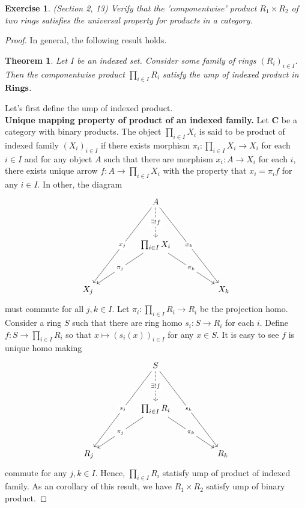 \documentclass[a4paper, 11pt]{book}
\theoremstyle{plain}
\newtheorem{exercise}{Exercise}
\newtheorem*{theorem}{Theorem}
\theoremstyle{plain}
\newcommand{\mb}{\mathbf}
\newcommand{\arr}{\rightarrow}
\newcommand{\C}{\mathbf{C}}
\begin{document}
  \begin{exercise}
    (Section 2, 13) 
    Verify that the 'componentwise' product $R_1 \times R_2$ of two rings satisfies the universal property for products in a category.
  \end{exercise}
  \begin{proof}
    In general, the following result holds.
    \begin{theorem}
      Let $I$ be an indexed set. Consider some family of rings $(R_i)_{i \in I}$. Then the componentwise product $\prod_{i \in I} R_i$ satisfy the ump of indexed product in $\mb{Rings}$. 
    \end{theorem}
      Let's first define the ump of indexed product. \\
      \textbf{Unique mapping property of product of an indexed family.} Let $\C$ be a category with binary products. The object $\prod_{i \in I} X_i$ is said to be product of indexed family $(X_i)_{i \in I}$ if there exists morphism $\pi_i:\prod_{i \in I} X_i \arr X_i$ for each $i \in I$ and for any object $A$ such that there are morphism $x_i: A \arr X_i$ for each $i$, there exists unique arrow $f:A \arr \prod_{i \in I} X_i$ with the property that $x_i=\pi_i f$ for any $i \in I$. In other, the diagram 
      \[\begin{tikzcd}
        && A \\
        \\
        && {\prod_{i \in I} X_i} \\
        \\
        {X_j} &&&& {X_k}
        \arrow["{\exists !f}"{description}, dashed, from=1-3, to=3-3]
        \arrow["{\pi_j}"{description}, from=3-3, to=5-1]
        \arrow["{\pi_k}"{description}, from=3-3, to=5-5]
        \arrow["{x_j}"'{description}, from=1-3, to=5-1]
        \arrow["{x_k}"'{description}, from=1-3, to=5-5]
      \end{tikzcd}\]
      must commute for all $j,k \in I$.
\newpage
      Let $\pi_i: \prod_{i \in I} R_i \arr R_i$ be the projection homo. Consider a ring $S$ such that there are ring homo $s_i: S \arr R_i$ for each $i$. Define $f:S \arr \prod_{i \in I} R_i$ so that $x \mapsto (s_i(x))_{i \in I}$ for any $x \in S$. It is easy to see $f$ is unique homo making 
      \[\begin{tikzcd}
        && S \\
        \\
        && {\prod_{i \in I} R_i} \\
        \\
        {R_j} &&&& {R_k}
        \arrow["{\exists !f}"{description}, dashed, from=1-3, to=3-3]
        \arrow["{\pi_j}"{description}, from=3-3, to=5-1]
        \arrow["{\pi_k}"{description}, from=3-3, to=5-5]
        \arrow["{s_j}"'{description}, from=1-3, to=5-1]
        \arrow["{s_k}"'{description}, from=1-3, to=5-5]
      \end{tikzcd}\]
      commute for any $j,k \in I$. Hence, $\prod_{i \in I} R_i$ statisfy ump of product of indexed family. As an corollary of this result, we have $R_1 \times R_2$ satisfy ump of binary product.
    \end{proof}
  
\end{document}
